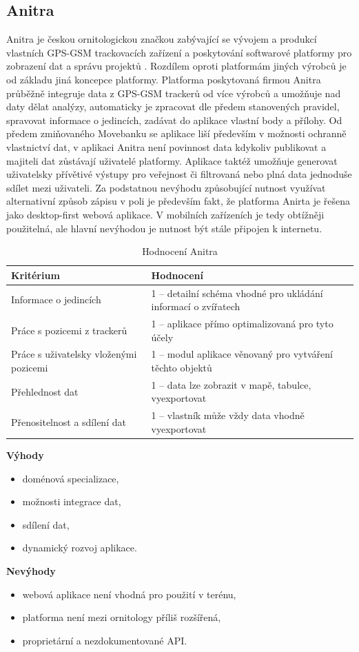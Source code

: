 \subsection{Anitra}

Anitra je českou ornitologickou značkou zabývající se vývojem a produkcí vlastních GPS-GSM trackovacích zařízení a poskytování softwarové platformy pro zobrazení dat a správu projektů \cite{krouzkovaniPtakuAnitra}. Rozdílem oproti platformám jiných výrobců je od základu jiná koncepce platformy. Platforma poskytovaná firmou Anitra průběžně integruje data z GPS-GSM trackerů od více výrobců a umožňuje nad daty dělat analýzy, automaticky je zpracovat dle předem stanovených pravidel, spravovat informace o jedincích, zadávat do aplikace vlastní body a přílohy. Od předem zmiňovaného Movebanku se aplikace liší především v možnosti ochranně vlastnictví dat, v aplikaci Anitra není povinnost data kdykoliv publikovat a majiteli dat zůstávají uživatelé platformy. Aplikace taktéž umožňuje generovat uživatelsky přívětivé výstupy pro veřejnost či filtrovaná nebo plná data jednoduše sdílet mezi uživateli. Za podstatnou nevýhodu způsobující nutnost využívat alternativní způsob zápisu v poli je především fakt, že platforma Anirta je řešena jako desktop-first webová aplikace. V mobilních zařízeních je tedy obtížněji použitelná, ale hlavní nevýhodou je nutnost být stále připojen k internetu.

\begin{table}[H]
	\begin{tabularx}{\textwidth}{ | X | X | }
		\hline			
		Kritérium                              & Hodnocení \\
		\hline			
		Informace o jedincích                  & 1 -- detailní schéma vhodné pro ukládání informací o zvířatech          \\
		\hline
		Práce s pozicemi z trackerů            & 1 -- aplikace přímo optimalizovaná pro tyto účely          \\
		\hline
		Práce s uživatelsky vloženými pozicemi & 1 -- modul aplikace věnovaný pro vytváření těchto objektů          \\
		\hline
		Přehlednost dat                        & 1 -- data lze zobrazit v mapě, tabulce, vyexportovat          \\
		\hline
		Přenositelnost a sdílení dat           & 1 -- vlastník může vždy data vhodně vyexportovat          \\
		\hline	
	\end{tabularx}
	\caption{Hodnocení Anitra}
\end{table}
\textbf{Výhody}
\nolisttopbreak
\begin{itemize}
	\item doménová specializace,
	\item možnosti integrace dat,
	\item sdílení dat,
	\item dynamický rozvoj aplikace.
\end{itemize}

\textbf{Nevýhody}
\nolisttopbreak
\begin{itemize}
	\item webová aplikace není vhodná pro použití v terénu,
	\item platforma není mezi ornitology příliš rozšířená,
	\item proprietární a nezdokumentované API.
\end{itemize}

